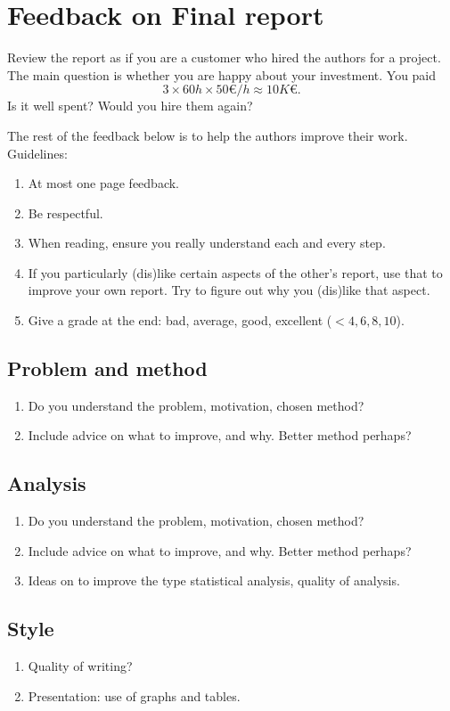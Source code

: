 \documentclass[report]{subfiles}
\begin{document}
\section{Feedback on Final report}
\label{sec:feedb-final-report}

Review the report as if you are a customer who hired the authors for a project.
The main question is whether you are happy about your investment. You paid
\begin{equation*}
3 \times 60 h \times 50 \euro/h \approx 10 K \euro.
\end{equation*}
Is it well spent? Would you hire them again?

The rest of the feedback below is to help the authors improve their work.
Guidelines:
\begin{enumerate}
\item At most one page feedback.
\item Be respectful.
\item When reading, ensure you really understand each and every step.
\item If you particularly (dis)like certain aspects of the other's report, use that to improve your own report. Try to figure out why you (dis)like that aspect.
\item Give a grade at the end: bad, average, good, excellent  ($<4, 6, 8, 10$).
\end{enumerate}


\subsection{Problem and method}
\begin{enumerate}
\item Do you understand the problem, motivation, chosen method?
\item Include advice on what to improve, and why. Better method perhaps?
\end{enumerate}

\subsection{Analysis}
\begin{enumerate}
\item Do you understand the problem, motivation, chosen method?
\item Include advice on what to improve, and why. Better method perhaps?
\item Ideas on to improve the type statistical analysis, quality of analysis.
\end{enumerate}


\subsection{Style}
\label{sec:style}

\begin{enumerate}
\item Quality of writing?
\item Presentation: use of graphs and tables.
\end{enumerate}
\end{document}
